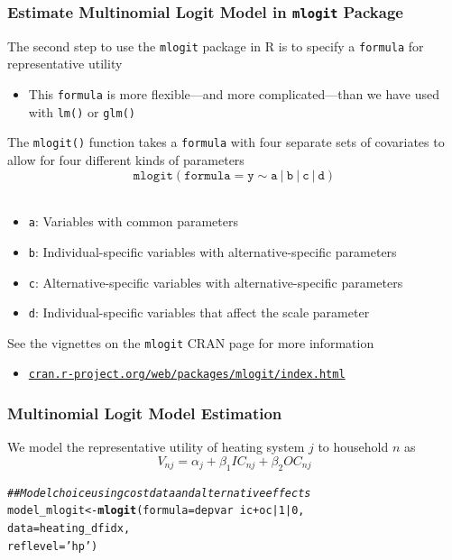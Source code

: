 \documentclass{beamer}\usepackage[]{graphicx}\usepackage[]{xcolor}
\makeatletter
\newcommand{\hlnum}[1]{\textcolor[rgb]{0.686,0.059,0.569}{#1}}%
\newcommand{\hlstr}[1]{\textcolor[rgb]{0.192,0.494,0.8}{#1}}%
\newcommand{\hlcom}[1]{\textcolor[rgb]{0.678,0.584,0.686}{\textit{#1}}}%
\newcommand{\hlopt}[1]{\textcolor[rgb]{0,0,0}{#1}}%
\newcommand{\hlstd}[1]{\textcolor[rgb]{0.345,0.345,0.345}{#1}}%
\newcommand{\hlkwb}[1]{\textcolor[rgb]{0.69,0.353,0.396}{#1}}%
\newcommand{\hlkwc}[1]{\textcolor[rgb]{0.333,0.667,0.333}{#1}}%
\newcommand{\hlkwd}[1]{\textcolor[rgb]{0.737,0.353,0.396}{\textbf{#1}}}%
\newenvironment{kframe}{%
 \def\at@end@of@kframe{}%
 \ifinner\ifhmode%
  \def\at@end@of@kframe{\end{minipage}}%
  \begin{minipage}{\columnwidth}%
 \fi\fi%
 \def\FrameCommand##1{\hskip\@totalleftmargin \hskip-\fboxsep
 \colorbox{shadecolor}{##1}\hskip-\fboxsep
     \hskip-\linewidth \hskip-\@totalleftmargin \hskip\columnwidth}%
 \MakeFramed {\advance\hsize-\width
   \@totalleftmargin\z@ \linewidth\hsize
   \@setminipage}}%
 {\par\unskip\endMakeFramed%
 \at@end@of@kframe}
\newenvironment{knitrout}{}{} %
\makeatother
\begin{document}
\begin{frame}\frametitle{Estimate Multinomial Logit Model in \texttt{mlogit} Package}
    The second step to use the \texttt{mlogit} package in R is to specify a \texttt{formula} for representative utility
    \begin{itemize}
    	\item This \texttt{formula} is more flexible---and more complicated---than we have used with \texttt{lm()} or \texttt{glm()}
    \end{itemize}
    \vspace{1ex}
    The \texttt{mlogit()} function takes a \texttt{formula} with four separate sets of covariates to allow for four different kinds of parameters
    $$\mathtt{mlogit(formula = y \sim a ~|~ b ~|~ c ~|~ d)}$$ \\
    \begin{itemize}
    	\item \texttt{a}: Variables with common parameters
    	\item \texttt{b}: Individual-specific variables with alternative-specific parameters
    	\item \texttt{c}: Alternative-specific variables with alternative-specific parameters
    	\item \texttt{d}: Individual-specific variables that affect the scale parameter
    \end{itemize}
    \vspace{1ex}
    See the vignettes on the \texttt{mlogit} CRAN page for more information
    \begin{itemize}
    	\item \href{https://cran.r-project.org/web/packages/mlogit/index.html}{\texttt{cran.r-project.org/web/packages/mlogit/index.html}}
    \end{itemize}
\end{frame}

\begin{frame}[fragile]\frametitle{Multinomial Logit Model Estimation}
    We model the representative utility of heating system $j$ to household $n$ as
    $$V_{nj} = \alpha_j + \beta_1 IC_{nj} + \beta_2 OC_{nj}$$
\begin{knitrout}\footnotesize
{}\color{fgcolor}\begin{kframe}
\begin{alltt}
\hlcom{## Model choice using cost data and alternative effects}
\hlstd{model_mlogit} \hlkwb{<-} \hlkwd{mlogit}\hlstd{(}\hlkwc{formula} \hlstd{= depvar} \hlopt{~} \hlstd{ic} \hlopt{+} \hlstd{oc} \hlopt{|} \hlnum{1} \hlopt{|} \hlnum{0}\hlstd{,}
                       \hlkwc{data} \hlstd{= heating_dfidx,}
                       \hlkwc{reflevel} \hlstd{=} \hlstr{'hp'}\hlstd{)}
\end{alltt}
\end{kframe}
\end{knitrout}
\end{frame}
\end{document}
